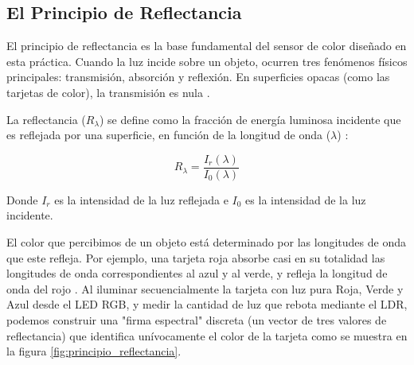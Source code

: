 \documentclass[conference]{IEEEtran}
\begin{document}
\subsection{El Principio de Reflectancia}
El principio de reflectancia es la base fundamental del sensor de color diseñado en esta práctica. Cuando la luz incide sobre un objeto, ocurren tres fenómenos físicos principales: transmisión, absorción y reflexión. En superficies opacas (como las tarjetas de color), la transmisión es nula \cite{ldr_9}. 

La reflectancia ($R_\lambda$) se define como la fracción de energía luminosa incidente que es reflejada por una superficie, en función de la longitud de onda ($\lambda$) \cite{ldr_10}:

\begin{equation}
R_\lambda = \frac{I_r(\lambda)}{I_0(\lambda)}
\label{eq:reflectancia}
\end{equation}

Donde $I_r$ es la intensidad de la luz reflejada e $I_0$ es la intensidad de la luz incidente.

El color que percibimos de un objeto está determinado por las longitudes de onda que este refleja. Por ejemplo, una tarjeta roja absorbe casi en su totalidad las longitudes de onda correspondientes al azul y al verde, y refleja la longitud de onda del rojo \cite{ldr_11}. Al iluminar secuencialmente la tarjeta con luz pura Roja, Verde y Azul desde el LED RGB, y medir la cantidad de luz que rebota mediante el LDR, podemos construir una "firma espectral" discreta (un vector de tres valores de reflectancia) que identifica unívocamente el color de la tarjeta como se muestra en la figura \ref{fig:principio_reflectancia}.
\end{document}
